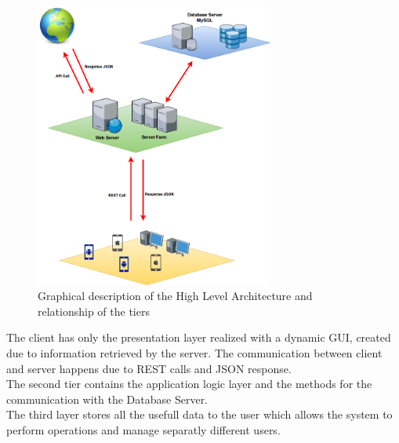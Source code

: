 \documentclass[numbers=noenddot, 12pt, a4paper, oneside]{scrbook}
\begin{document}
\begin{figure}[H]
	\centering
	\includegraphics[width=0.7\textwidth]{images/HighLevelArchitecture}
	\caption{Graphical description of the High Level Architecture and relationship of the tiers}
\end{figure}

The client has only the presentation layer realized with a dynamic GUI, created due to information retrieved by the server. The communication between client and server happens due to REST calls and JSON response.\\

The second tier contains the application logic layer and the methods for the communication with the Database Server.\\

The third layer stores all the usefull data to the user which allows the system to perform operations and manage separatly different users.
\end{document}
